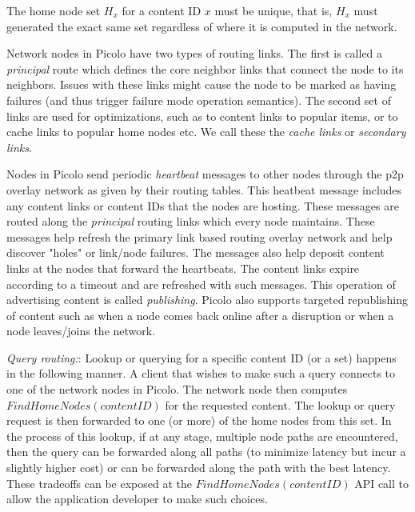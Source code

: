 \begin{property} The home node set \(H_x\) for a content ID \(x\) must be unique, that is,
    \(H_x\) must generated the exact same set regardless of where it is computed in the network.
\label{property_unique_home}
\end{property}

Network nodes in Picolo have two types of routing links. The first is called a {\em principal} route which defines the
core neighbor links that connect the node to its neighbors. Issues with these links might cause the node to be marked as
having failures (and thus trigger failure mode operation semantics). The second set of links are used for optimizations,
such as to content links to popular items, or to cache links to popular home nodes etc. We call these the {\em cache
links} or {\em secondary links}.

Nodes in Picolo send periodic {\em heartbeat} messages to other nodes through the p2p overlay network as given by their
routing tables. This heatbeat message includes any content links or content IDs that the nodes are hosting. These messages
are routed along the {\em principal} routing links which every node maintains. These messages help refresh the primary
link based routing overlay network and help discover "holes" or link/node failures. The messages also help deposit
content links at the nodes that forward the heartbeats. The content links expire according to a timeout and are
refreshed with such messages. This operation of advertising content is called {\em publishing}. Picolo also supports
targeted republishing of content such as when a node comes back online after a disruption or when a node leaves/joins
the network.

{\em Query routing:}: Lookup or querying for a specific content ID (or a set) happens in the following manner. A client
that wishes to make such a query connects to one of the network nodes in Picolo. The network node then computes
\(FindHomeNodes(contentID)\) for the requested content. The lookup or query request is then forwarded to one (or more)
of the home nodes from this set. In the process of this lookup, if at any stage, multiple node paths are encountered,
then the query can be forwarded along all paths (to minimize latency but incur a slightly higher cost) or can be
forwarded along the path with the best latency. These tradeoffs can be exposed at the \(FindHomeNodes(contentID)\) API
call to allow the application developer to make such choices.

